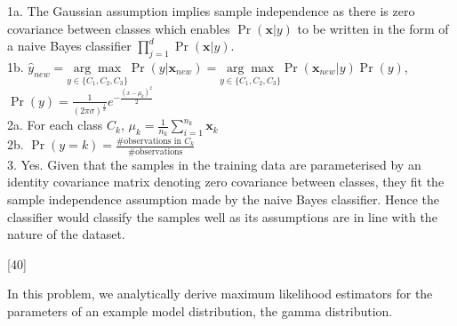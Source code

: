 \documentclass[]{../util/ColumbiaAssm}
\begin{document}
\begin{questions}
\begin{solution}
\newline
1a. The Gaussian assumption implies sample independence as there is zero covariance between classes which enables $\Pr(\mathbf{x}|y)$ to be written in the form of a naive Bayes classifier $\prod\limits^{d}_{j=1} \Pr(\mathbf{x}|y)$.\\
1b. $\hat{y}_{new} 
= \underset{y \in \{C_1, C_2, C_3\}}{\arg\max} \Pr(y|\mathbf{x}_{new}) = \underset{y \in \{C_1, C_2, C_3\}}{\arg\max}\Pr(\mathbf{x}_{new}|y)\Pr(y)$, $\Pr(y) = \frac{1}{(2\pi\sigma)^\frac{1}{2}} e^{-\frac{(x-\mu_k)^2}{2}}$\\
2a. For each class $C_k$, $\mu_k = \frac{1}{n_k} \sum\limits_{i=1}^{n_k} \mathbf{x}_k$ \\
2b. $\Pr(y = k) = \frac{\textrm{\# observations in }C_k}{\# \textrm{observations}}$\\
3. Yes. Given that the samples in the training data are parameterised by an identity covariance matrix denoting zero covariance between classes, they fit the sample independence assumption made by the naive Bayes classifier. Hence the classifier would classify the samples well as its assumptions are in line with the nature of the dataset. 
\end{solution}


[40]

In this problem, we analytically derive maximum likelihood
estimators for the parameters of an example model
distribution, the gamma distribution.
    

\end{questions}
\end{document}
